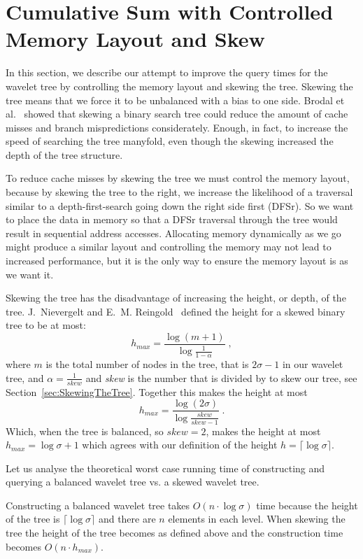 \section{Cumulative Sum with Controlled Memory Layout and Skew}
\label{sec:memorylayout}
In this section, we describe our attempt to improve the query times for the wavelet tree by controlling the memory layout and skewing the tree.
Skewing the tree means that we force it to be unbalanced with a bias to one side. 
Brodal et al.~ showed that skewing a binary search tree could reduce the amount of cache misses and branch mispredictions considerately. Enough, in fact, to increase the speed of searching the tree manyfold, even though the skewing increased the depth of the tree structure.

To reduce cache misses by skewing the tree we must control the memory layout, because by skewing the tree to the right, we increase the likelihood of a traversal similar to a depth-first-search going down the right side first (DFSr). So we want to place the data in memory so that a DFSr traversal through the tree would result in sequential address accesses.
Allocating memory dynamically as we go might produce a similar layout and controlling the memory may not lead to increased performance, but it is the only way to ensure the memory layout is as we want it.

Skewing the tree has the disadvantage of increasing the height, or depth, of the tree.
J.~Nievergelt and E.~M. Reingold~ defined the height for a skewed binary tree to be at most:
\[ h_{max} = \frac{\log(m+1)}{ \log\frac{1}{1-\alpha}} \;,\]
where $m$ is the total number of nodes in the tree, that is $2 \sigma - 1$ in our wavelet tree, and $\alpha = \frac{1}{\mathit{skew}}$ and \textit{skew} is the number that is divided by to skew our tree, see Section~\ref{sec:SkewingTheTree}.
Together this makes the height at most
\[ h_{max} = \frac{\log(2 \sigma)}{ \log\frac{\mathit{skew}}{\mathit{skew} - 1}}  \;.\]
Which, when the tree is balanced, so $\mathit{skew} = 2$, makes the height at most $h_{max} = \log \sigma + 1$ which agrees with our definition of the height $h = \lceil \log \sigma \rceil$.

Let us analyse the theoretical worst case running time of constructing and querying a balanced wavelet tree vs. a skewed wavelet tree.

Constructing a balanced wavelet tree takes  $O(n \cdot \log \sigma)$ time because the height of the tree is $\lceil \log \sigma \rceil$ and there are $n$ elements in each level.
When skewing the tree the height of the tree becomes as defined above and the construction time becomes $O(n \cdot h_{max})$.

